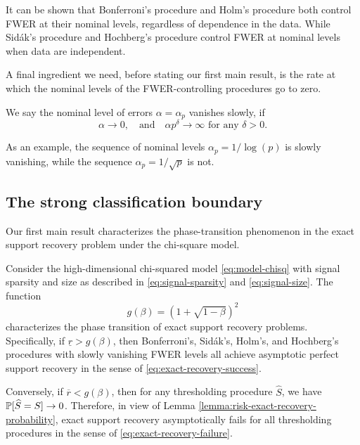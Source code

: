 It can be shown that Bonferroni's procedure and Holm's procedure both control FWER at their nominal levels, regardless of dependence in the data.
While Sid\'ak's procedure and Hochberg's procedure control FWER at nominal levels when data are independent.

A final ingredient we need, before stating our first main result, is the rate at which the nominal levels of the FWER-controlling procedures go to zero.
\begin{definition} \label{def:slowly-vanishing}
We say the nominal level of errors $\alpha = \alpha_p$ vanishes slowly, if
\begin{equation} \label{eq:slowly-vanishing-error}
    \alpha\to 0,\quad \text{and} \quad \alpha p^\delta\to\infty \text{  for any } \delta>0.
\end{equation}
\end{definition}
As an example, the sequence of nominal levels $\alpha_p = 1/\log{(p)}$ is slowly vanishing, while the sequence $\alpha_p = 1/\sqrt{p}$ is not.

\subsection{The strong classification boundary}
\label{subsec:strong-classification-boundary}

Our first main result characterizes the phase-transition phenomenon in the exact support recovery problem under the chi-square model.

\begin{theorem} \label{thm:chi-squred-strong-boundary}
Consider the high-dimensional chi-squared model \eqref{eq:model-chisq} with signal sparsity and size as described in \eqref{eq:signal-sparsity} and \eqref{eq:signal-size}.
The function 
\begin{equation} \label{eq:strong-classification-boundary-chisquared}
    g(\beta) = \left(1 + \sqrt{1-\beta}\right)^2
\end{equation}
characterizes the phase transition of exact support recovery problems.
Specifically, if $\underline{r} > {{g}}(\beta)$, then Bonferroni's, Sid\'ak's, Holm's, and Hochberg's procedures with slowly vanishing FWER levels all achieve asymptotic perfect support recovery in the sense of \eqref{eq:exact-recovery-success}. 

Conversely, if $\overline{r} < {{g}}(\beta)$, then for any thresholding procedure $\widehat{S}$, we have $\P[\widehat{S}=S]\to0$.
Therefore, in view of Lemma \ref{lemma:risk-exact-recovery-probability}, exact support recovery asymptotically fails for all thresholding procedures in the sense of \eqref{eq:exact-recovery-failure}.
\end{theorem}

